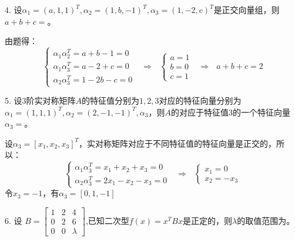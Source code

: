 \documentclass{article}
\begin{document}
4. 设$\alpha_{1}=(a,1,1)^{T},\alpha_{2}=(1,b,-1)^{T},\alpha_{3}=(1,-2,c)^{T}$是正交向量组，则$a+b+c=$\underline{\hphantom{~~~~~~~~~~}}。

\begin{jie}
由题得：
\begin{equation*}
\begin{cases}
\alpha_1\alpha_2^T=a+b-1=0\\
\alpha_1\alpha_3^T=a-2+c=0\\
\alpha_2\alpha_3^T=1-2b-c=0
\end{cases}
~~~\Rightarrow~~~
\begin{cases}
a=1\\
b=0\\
c=1
\end{cases}~~~\Rightarrow~~~a+b+c=2
\end{equation*}
\end{jie}

5. 设3阶实对称矩阵$A$的特征值分别为$1,2,3$对应的特征向量分别为$\alpha_ {1}=(1,1,1)^{T},\alpha_{2}=(2,-1,-1)^{T},\alpha_{3}$，则$A$的对应于特征值3的一个特征向量$\alpha_{3}=$\underline{\hphantom{~~~~~~~~~~}}。

\begin{jie}
设$\alpha_3=[x_1,x_2,x_3]^T$，实对称矩阵对应于不同特征值的特征向量是正交的，所以：
\begin{equation*}
\begin{cases}
\alpha_{1}\alpha_3^T=x_1+x_2+x_3=0\\
\alpha_{2}\alpha_3^T=2x_1-x_2-x_3=0
\end{cases}~~~\Rightarrow~~~
\begin{cases}
x_1=0\\
x_2=-x_3
\end{cases}
\end{equation*}
令$x_{3}=-1$，有$\alpha_3=[0,1,-1]$
\end{jie}

6. 设
$
B=
\begin{bmatrix}
  1 & 2 & 4 \\
  0 & 2 & 6\\
  0 & 0 & \lambda
\end{bmatrix}
$,已知二次型$f(x)=x^{T}Bx$是正定的，则$\lambda$的取值范围为\underline{\hphantom{~~~~~~~~~~}}。
\end{document}
